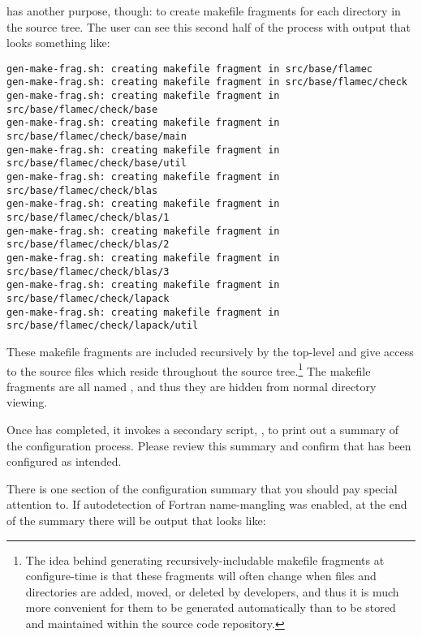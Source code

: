 \configure has another purpose, though: to create makefile fragments for each
directory in the source tree.
The user can see this second half of the \configure process with output
that looks something like:

\begin{Verbatim}[frame=single,framesep=2.5mm,xleftmargin=5mm,commandchars=\\\{\},fontsize=\footnotesize]
gen-make-frag.sh: creating makefile fragment in src/base/flamec
gen-make-frag.sh: creating makefile fragment in src/base/flamec/check
gen-make-frag.sh: creating makefile fragment in src/base/flamec/check/base
gen-make-frag.sh: creating makefile fragment in src/base/flamec/check/base/main
gen-make-frag.sh: creating makefile fragment in src/base/flamec/check/base/util
gen-make-frag.sh: creating makefile fragment in src/base/flamec/check/blas
gen-make-frag.sh: creating makefile fragment in src/base/flamec/check/blas/1
gen-make-frag.sh: creating makefile fragment in src/base/flamec/check/blas/2
gen-make-frag.sh: creating makefile fragment in src/base/flamec/check/blas/3
gen-make-frag.sh: creating makefile fragment in src/base/flamec/check/lapack
gen-make-frag.sh: creating makefile fragment in src/base/flamec/check/lapack/util
\end{Verbatim}

\noindent
These makefile fragments are included recursively by the top-level \makefile
and give \make access to the source files which reside throughout the source
tree.\footnote{
The idea behind generating recursively-includable makefile fragments at
configure-time is that these fragments will often change when files and
directories are added, moved, or deleted by \libflame developers, and thus
it is much more convenient for them to be generated automatically than to be
stored and maintained within the source code repository.}
The makefile fragments are all named \fragmentmkns, and thus they are hidden
from normal directory viewing.

Once \configure has completed, it invokes a secondary script, \postconfigurens,
to print out a summary of the configuration process.
Please review this summary and confirm that \libflame has been configured as
intended.

There is one section of the configuration summary that you should pay special
attention to.
If autodetection of Fortran name-mangling was enabled, at the end of the summary
there will be output that looks like:

